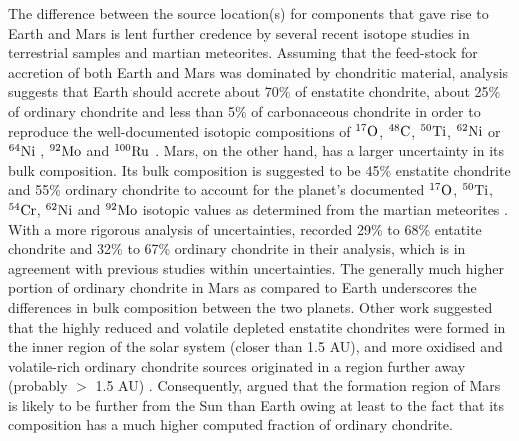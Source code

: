 \documentclass{aa}
\begin{document}
The difference between the source location(s) for components that gave rise to Earth and Mars is lent further credence by several recent isotope studies in terrestrial samples and martian meteorites. Assuming that the feed-stock for accretion of both Earth and Mars was dominated by chondritic material, analysis suggests that Earth should accrete  about 70$\%$ of enstatite chondrite, about 25$\%$ of ordinary chondrite and less than 5$\%$ of carbonaceous chondrite in order to reproduce the well-documented isotopic compositions of $^{17} \rm O$, $^{48} \rm C$, $^{50} \rm Ti$, $^{62} \rm Ni$ or $^{64} \rm Ni$ , $^{92} \rm Mo$ and $^{100} \rm Ru$ \citep{dauphas2014calcium,dauphas2017isotopic,fischer2017ruthenium}. Mars, on the other hand, has a larger uncertainty in its bulk composition. Its bulk composition is suggested to be 45\% enstatite chondrite and 55\% ordinary chondrite to account for the planet's documented $^{17} \rm O$, $^{50} \rm Ti$, $^{54} \rm Cr$, $^{62} \rm Ni$ and $^{92} \rm Mo$ isotopic values as determined from the martian meteorites \citep{sanloup1999simple,tang201460fe}. With a more rigorous analysis of uncertainties, \cite{brasser2018GRL} recorded 29\% to 68\% entatite chondrite and 32\% to 67\% ordinary chondrite in their analysis, which is in agreement with previous studies within uncertainties. The generally much higher portion of ordinary chondrite in Mars as compared to Earth underscores the differences in bulk composition between the two planets. Other work suggested that the highly reduced and volatile depleted enstatite chondrites were formed in the inner region of the solar system (closer than 1.5 AU), and more oxidised and volatile-rich ordinary chondrite sources originated in a region further away (probably $>$ 1.5 AU) \citep{morbidelli2012building,rubie2015accretion,fischer2017ruthenium}. Consequently, \cite{brasser2017cool} argued that the formation region of Mars is likely to be further from the Sun than Earth owing at least to the fact that its composition has a much higher computed fraction of ordinary chondrite.
\end{document}
